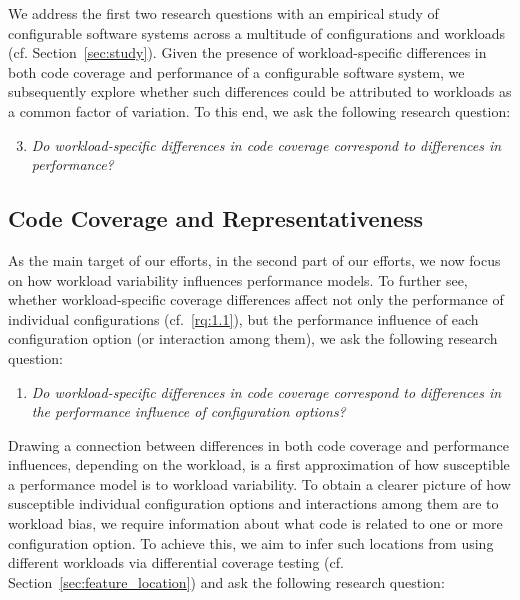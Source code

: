 We address the first two research questions with an empirical study of configurable software systems across a multitude of configurations and workloads (cf. Section~\ref{sec:study}). Given the presence of workload-specific differences in both code coverage and performance of a configurable software system, we subsequently explore whether such differences could be attributed to workloads as a common factor of variation. To this end, we ask the following research question:

\begin{enumerate}[align=left,label=RQ1.\arabic*]
	\setcounter{enumi}{2}
	\item\textit{Do workload-specific differences in code coverage correspond to differences in performance?}\label{rq:1.3}
\end{enumerate}

\subsection{Code Coverage and Representativeness}
As the main target of our efforts, in the second part of our efforts, we now focus on how workload variability influences performance models. To further see, whether workload-specific coverage differences affect not only the performance of individual configurations (cf.~\ref{rq:1.1}), but the performance influence of each configuration option (or interaction among them), we ask the following research question:

\begin{enumerate}[align=left,label=RQ2.\arabic*]
	\item\textit{Do workload-specific differences in code coverage correspond to differences in the performance influence of configuration options?}\label{rq:2.1}
\end{enumerate}

Drawing a connection between differences in both code coverage and performance influences, depending on the workload, is a first approximation of how susceptible a performance model is to workload variability. To obtain a clearer picture of how susceptible individual configuration options and interactions among them are to workload bias, we require information about what code is related to one or more configuration option. To achieve this, we aim to infer such locations from using different workloads via differential coverage testing (cf. Section~\ref{sec:feature_location}) and ask the following research question:

